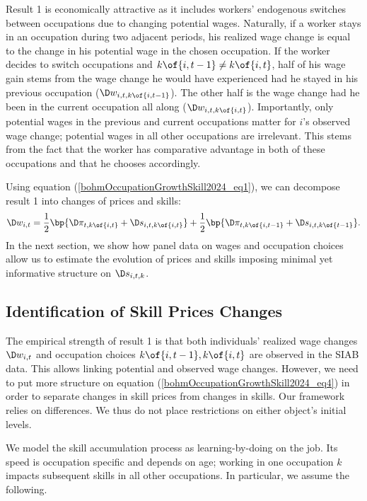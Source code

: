 \documentclass[12pt]{article}
\theoremstyle{definition}
\begin{document}
Result 1 is economically attractive as it includes workers' endogenous switches between occupations due to changing potential wages. Naturally, if a worker stays in an occupation during two adjacent periods, his realized wage change is equal to the change in his potential wage in the chosen occupation. If the worker decides to switch occupations and $k\of{i, t-1} \neq k\of{i, t}$, half of his wage gain stems from the wage change he would have experienced had he stayed in his previous occupation ($\D w_{i, t, k\of{i,t-1}}$). The other half is the wage change had he been in the current occupation all along ($\D w_{i, t, k\of{i,t}}$). Importantly, only potential wages in the previous and current occupations matter for $i$'s observed wage change; potential wages in all other occupations are irrelevant. This stems from the fact that the worker has comparative advantage in both of these occupations and that he chooses accordingly.

Using equation (\ref{bohmOccupationGrowthSkill2024_eq1}), we can decompose result 1 into changes of prices and skills:
\begin{equation}
    \label{bohmOccupationGrowthSkill2024_eq4}
    \D w_{i,t} = \frac{1}{2} \bp{\D \pi_{t, k\of{i,t}} + \D s_{i, t, k\of{i,t}}} + \frac{1}{2} \bp{\D \pi_{t, k\of{i, t-1}} + \D s_{i, t, k\of{t-1}}}.
\end{equation}
In the next section, we show how panel data on wages and occupation choices allow us to estimate the evolution of prices and skills imposing minimal yet informative structure on $\D s_{i, t, k}$.

\subsection{Identification of Skill Prices Changes}

The empirical strength of result 1 is that both individuals' realized wage changes $\D w_{i,t}$ and occupation choices $k\of{i, t-1}, k\of{i,t}$ are observed in the SIAB data. This allows linking potential and observed wage changes. However, we need to put more structure on equation (\ref{bohmOccupationGrowthSkill2024_eq4}) in order to separate changes in skill prices from changes in skills. Our framework relies on differences. We thus do not place restrictions on either object's initial levels.

We model the skill accumulation process as learning-by-doing on the job. Its speed is occupation specific and depends on age; working in one occupation $k$ impacts subsequent skills in all other occupations. In particular, we assume the following.
\end{document}
